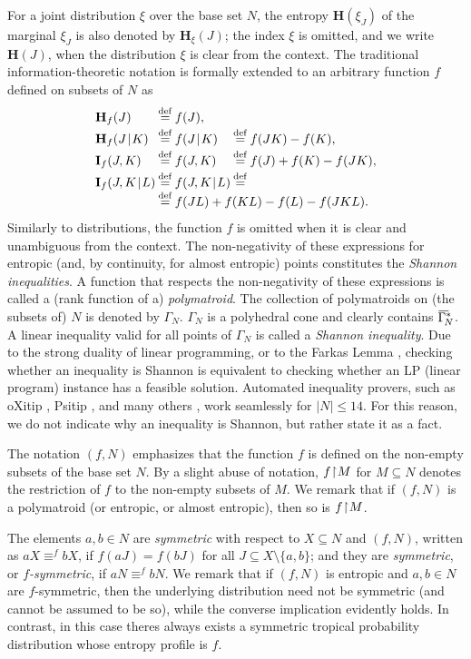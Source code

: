 \documentclass[a4paper]{IEEEtran}
\def\|{\mskip1.5mu{|}\mskip1.5mu}
\def\H{\mathbf H}
\def\I{\mathbf I}
\newcommand\restr{\mkern1mu{\upharpoonright}\mkern1mu}
\newcommand\GN{\Gamma_{\!N}}
\def\barGamma{\mkern1mu\overline{\hbox{$\mkern-1mu\Gamma\mkern4mu$}}\mkern-4mu}
\def\clGa#1{\barGamma^*_{\!#1}}
\newcommand\eqdef{\stackrel{\mathrm{def}}{=}}
\theoremstyle{definition}
\begin{document}
For a joint distribution $\xi$ over the base set $N$, the entropy
$\H(\xi_J)$ of the marginal $\xi_J$ is also denoted by $\H_\xi(J)$; the
index $\xi$ is omitted, and we write $\H(J)$, when the distribution $\xi$ is
clear from the context. The traditional information-theoretic notation is
formally extended to an arbitrary function $f$ defined on subsets of $N$ as
$$\begin{array}{l@{\:\eqdef\:}l@{}l}
  \H_f(J) & f(J), \\[2pt]
  \H_f(J\|K) & f(J\|K) &{\:\eqdef\:} f(JK)-f(K), \\[2pt]
  \I_f(J,K)  & f(J,K)  &{\:\eqdef\:} f(J)+f(K)-f(JK), \\[2pt]
  \I_f(J,K\|L) & f(J,K\|L)&{\:\eqdef\:}\\
               & \hbox to 0pt{$f(JL)+f(KL)-f(L)-f(JKL).$\hss}
\end{array}$$
Similarly to distributions, the function $f$ is omitted when it is clear and
unambiguous from the context. The non-negativity of these expressions for
entropic (and, by continuity, for almost entropic) points constitutes the
\emph{Shannon inequalities}. A function that respects the non-negativity of
these expressions is called a (rank function of a) \emph{polymatroid}. The
collection of polymatroids on (the subsets of) $N$ is denoted by $\GN$.
$\GN$ is a polyhedral cone and clearly contains $\clGa N$. A linear
inequality valid for all points of $\GN$ is called a \emph{Shannon
inequality}. Due to the strong duality of linear programming, or to the
Farkas Lemma \cite{ziegler}, checking whether an inequality is Shannon is
equivalent to checking whether an LP (linear program) instance has a
feasible solution. Automated inequality provers, such as \textsf{oXitip}
\cite{ITIP}, \textsf{Psitip} \cite{Li23}, and many others \cite{W-auto},
work seamlessly for $|N|\le 14$. For this reason, we do not
indicate why an inequality is Shannon, but rather state it as a fact.
 
The notation $(f,N)$ emphasizes that the function $f$ is defined on the
non-empty subsets of the base set $N$. By a slight abuse of notation,
$f\restr M$ for $M\subseteq N$ denotes the restriction of $f$ to the
non-empty subsets of $M$. We remark that if $(f,N)$ is a polymatroid (or
entropic, or almost entropic), then so is $f\restr M$.

The elements $a,b\in N$ are \emph{symmetric} with respect to $X\subseteq N$
and $(f,N)$, written as $aX\equiv^f bX$, if $f(aJ)=f(bJ)$ for all $J
\subseteq X\setminus\{a,b\}$; and they are \emph{symmetric}, or
\emph{$f$-symmetric}, if $aN\equiv^f bN$. We remark that if $(f,N)$ is
entropic and $a,b\in N$ are $f$-symmetric, then the underlying distribution
need not be symmetric (and cannot be assumed to be so), while the converse
implication evidently holds. In contrast, in this case theres always exists a
symmetric tropical probability distribution whose entropy profile is $f$.
\end{document}
